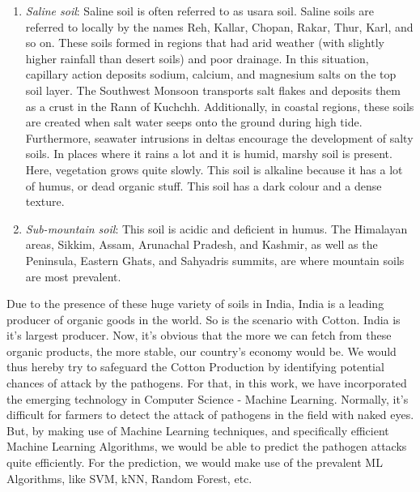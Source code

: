\documentclass[conference]{IEEEtran}
\begin{document}
\begin{enumerate}
\item \textit{Saline soil}: Saline soil is often referred to as usara soil. Saline soils are referred to locally by the names Reh, Kallar, Chopan, Rakar, Thur, Karl, and so on. These soils formed in regions that had arid weather (with slightly higher rainfall than desert soils) and poor drainage. In this situation, capillary action deposits sodium, calcium, and magnesium salts on the top soil layer. The Southwest Monsoon transports salt flakes and deposits them as a crust in the Rann of Kuchchh. Additionally, in coastal regions, these soils are created when salt water seeps onto the ground during high tide. Furthermore, seawater intrusions in deltas encourage the development of salty soils. In places where it rains a lot and it is humid, marshy soil is present. Here, vegetation grows quite slowly. This soil is alkaline because it has a lot of humus, or dead organic stuff. This soil has a dark colour and a dense texture.
\item \textit{Sub-mountain soil}: This soil is acidic and deficient in humus. The Himalayan areas, Sikkim, Assam, Arunachal Pradesh, and Kashmir, as well as the Peninsula, Eastern Ghats, and Sahyadris summits, are where mountain soils are most prevalent.
\end{enumerate}

Due to the presence of these huge variety of soils in India, India is a leading producer of organic goods in the world. So is the scenario with Cotton. India is it's largest producer. Now, it's obvious that the more we can fetch from these organic products, the more stable, our country's economy would be. We would thus hereby try to safeguard the Cotton Production by identifying potential chances of attack by the pathogens. For that, in this work, we have incorporated the emerging technology in Computer Science - Machine Learning. Normally, it's difficult for farmers to detect the attack of pathogens in the field with naked eyes. But, by making use of Machine Learning techniques, and specifically efficient Machine Learning Algorithms, we would be able to predict the pathogen attacks quite efficiently. For the prediction, we would make use of the prevalent ML Algorithms, like SVM, kNN, Random Forest, etc. 
\end{document}
